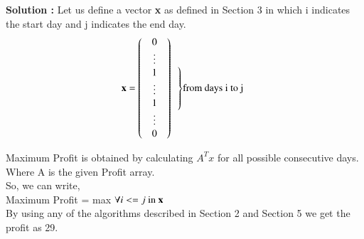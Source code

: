 \documentclass[journal,12pt,twocolumn]{IEEEtran}
\begin{document}
\textbf{Solution :}
Let us define a vector \textbf{x} as defined in Section 3 in which i indicates the start day and j indicates the end day.\\

\[
{\bf x} = \left( 
      \begin{array}{c}
        \begin{array}{c}
          0 \\ \vdots \\ 1 \\ \vdots \\
        \end{array} \\
        \begin{array}{c}
          1 \\ \vdots \\ 0
        \end{array}
      \end{array}
    \right)
\begin{array}{c}
    \noleftdelimiter
    \vphantom{\begin{array}{c}
      x_1 \\ \vdots \\ x_{n_1}
    \end{array}}
    \right\} $from days i to j$
  \end{array}
\]

Maximum Profit is obtained by calculating $A^{T}x$ for all possible consecutive days. Where A is the given Profit array.\\

So, we can write,\\
Maximum Profit = max $\forall i<=j \text{ in \textbf{x}}$ \\

By using any of the algorithms described in Section 2 and Section 5 we get the profit as 29.
\end{document}
